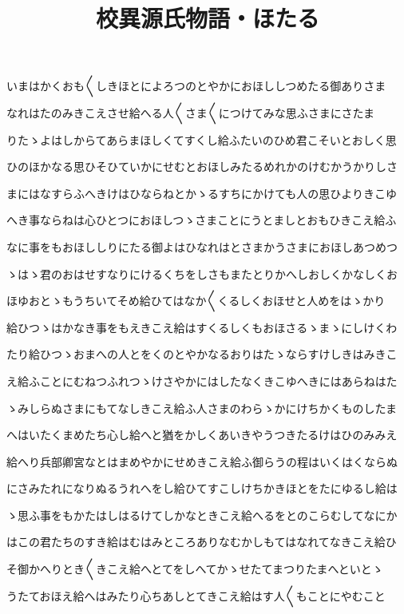 \documentclass[a4paper,11pt,landscape]{ltjtarticle}
\title{校異源氏物語・ほたる}
\date{}
\begin{document}
\maketitle

いまはかくおも〱しきほとによろつのとやかにおほししつめたる御ありさま
\par\medskip
なれはたのみきこえさせ給へる人〱さま〱につけてみな思ふさまにさたま
\par\medskip
りたゝよはしからてあらまほしくてすくし給ふたいのひめ君こそいとおしく思
\par\medskip
ひのほかなる思ひそひていかにせむとおほしみたるめれかのけむかうかりしさ
\par\medskip
まにはなすらふへきけはひならねとかゝるすちにかけても人の思ひよりきこゆ
\par\medskip
へき事ならねは心ひとつにおほしつゝさまことにうとましとおもひきこえ給ふ
\par\medskip
なに事をもおほししりにたる御よはひなれはとさまかうさまにおほしあつめつ
\par\medskip
ゝはゝ君のおはせすなりにけるくちをしさもまたとりかへしおしくかなしくお
\par\medskip
ほゆおとゝもうちいてそめ給ひてはなか〱くるしくおほせと人めをはゝかり
\par\medskip
給ひつゝはかなき事をもえきこえ給はすくるしくもおほさるゝまゝにしけくわ
\par\medskip
たり給ひつゝおまへの人とをくのとやかなるおりはたゝならすけしきはみきこ
\par\medskip
え給ふことにむねつふれつゝけさやかにはしたなくきこゆへきにはあらねはた
\par\medskip
ゝみしらぬさまにもてなしきこえ給ふ人さまのわらゝかにけちかくものしたま
\par\medskip
へはいたくまめたち心し給へと猶をかしくあいきやうつきたるけはひのみみえ
\par\medskip
給へり兵部卿宮なとはまめやかにせめきこえ給ふ御らうの程はいくはくならぬ
\par\medskip
にさみたれになりぬるうれへをし給ひてすこしけちかきほとをたにゆるし給は
\par\medskip
ゝ思ふ事をもかたはしはるけてしかなときこえ給へるをとのこらむしてなにか
\par\medskip
はこの君たちのすき給はむはみところありなむかしもてはなれてなきこえ給ひ
\par\medskip
そ御かへりとき〱きこえ給へとてをしへてかゝせたてまつりたまへといとゝ
\par\medskip
うたておほえ給へはみたり心ちあしとてきこえ給はす人〱もことにやむこと
\end{document}
